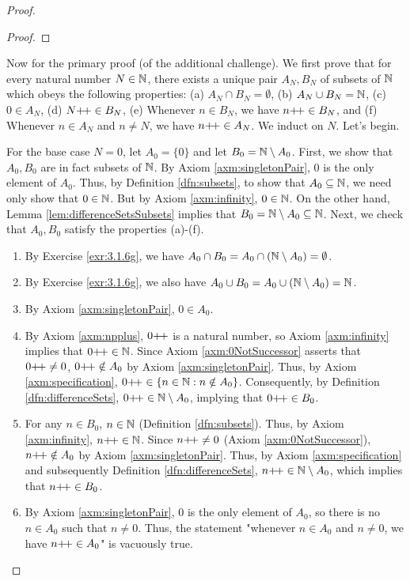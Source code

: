 \documentclass[../main.tex]{subfiles}
\begin{document}
\begin{enumerate}[ref={\thesection.\arabic*}]
\begin{proof}
\begin{lem}
\begin{proof}
            \end{proof}
        \end{lem}
        Now for the primary proof (of the additional challenge). We first prove that for every natural number $N\in\mathbb{N}$, there exists a unique pair $A_N,B_N$ of subsets of $\mathbb{N}$ which obeys the following properties: (a) $A_N\cap B_N=\emptyset$, (b) $A_N\cup B_N=\mathbb{N}$, (c) $0\in A_N$, (d) $N{+\!+}\in B_N$, (e) Whenever $n\in B_N$, we have $n{+\!+}\in B_N$, and (f) Whenever $n\in A_N$ and $n\neq N$, we have $n{+\!+}\in A_N$. We induct on $N$. Let's begin.\par
        For the base case $N=0$, let $A_0=\{0\}$ and let $B_0=\mathbb{N}\setminus A_0$. First, we show that $A_0,B_0$ are in fact subsets of $\mathbb{N}$. By Axiom \ref{axm:singletonPair}, 0 is the only element of $A_0$. Thus, by Definition \ref{dfn:subsets}, to show that $A_0\subseteq\mathbb{N}$, we need only show that $0\in\mathbb{N}$. But by Axiom \ref{axm:infinity}, $0\in\mathbb{N}$. On the other hand, Lemma \ref{lem:differenceSetsSubsets} implies that $B_0=\mathbb{N}\setminus A_0\subseteq\mathbb{N}$. Next, we check that $A_0,B_0$ satisfy the properties (a)-(f).
        \begin{enumerate}
            \item By Exercise \ref{exr:3.1.6g}, we have $A_0\cap B_0=A_0\cap(\mathbb{N}\setminus A_0)=\emptyset$.
            \item By Exercise \ref{exr:3.1.6g}, we also have $A_0\cup B_0=A_0\cup(\mathbb{N}\setminus A_0)=\mathbb{N}$.
            \item By Axiom \ref{axm:singletonPair}, $0\in A_0$.
            \item By Axiom \ref{axm:npplus}, $0{+\!+}$ is a natural number, so Axiom \ref{axm:infinity} implies that $0{+\!+}\in\mathbb{N}$. Since Axiom \ref{axm:0NotSuccessor} asserts that $0{+\!+}\neq 0$, $0{+\!+}\notin A_0$ by Axiom \ref{axm:singletonPair}. Thus, by Axiom \ref{axm:specification}, $0{+\!+}\in\{n\in\mathbb{N}:n\notin A_0\}$. Consequently, by Definition \ref{dfn:differenceSets}, $0{+\!+}\in\mathbb{N}\setminus A_0$, implying that $0{+\!+}\in B_0$.
            \item For any $n\in B_0$, $n\in\mathbb{N}$ (Definition \ref{dfn:subsets}). Thus, by Axiom \ref{axm:infinity}, $n{+\!+}\in\mathbb{N}$. Since $n{+\!+}\neq 0$ (Axiom \ref{axm:0NotSuccessor}), $n{+\!+}\notin A_0$ by Axiom \ref{axm:singletonPair}. Thus, by Axiom \ref{axm:specification} and subsequently Definition \ref{dfn:differenceSets}, $n{+\!+}\in\mathbb{N}\setminus A_0$, which implies that $n{+\!+}\in B_0$.
            \item By Axiom \ref{axm:singletonPair}, 0 is the only element of $A_0$, so there is no $n\in A_0$ such that $n\neq 0$. Thus, the statement "whenever $n\in A_0$ and $n\neq 0$, we have $n{+\!+}\in A_0$" is vacuously true.

\end{enumerate}
\end{proof}
\end{enumerate}
\end{document}
